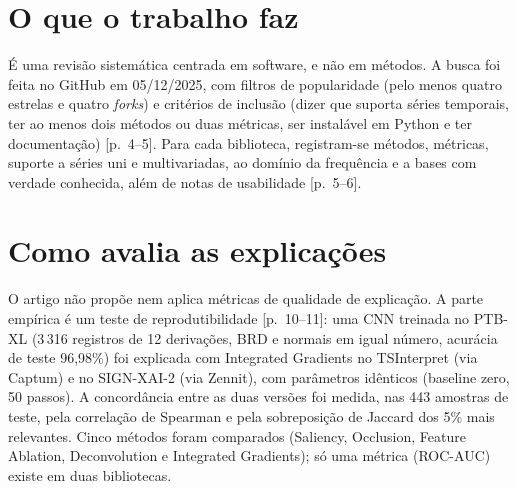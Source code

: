 \documentclass[11pt,a4paper]{article}
\begin{document}
\section{O que o trabalho faz}
É uma revisão sistemática centrada em software, e não em métodos. A busca foi feita no GitHub em 05/12/2025, com filtros de popularidade (pelo menos quatro estrelas e quatro \textit{forks}) e critérios de inclusão (dizer que suporta séries temporais, ter ao menos dois métodos ou duas métricas, ser instalável em Python e ter documentação) [p.~4--5]. Para cada biblioteca, registram-se métodos, métricas, suporte a séries uni e multivariadas, ao domínio da frequência e a bases com verdade conhecida, além de notas de usabilidade [p.~5--6].

\section{Como avalia as explicações}
O artigo não propõe nem aplica métricas de qualidade de explicação. A parte empírica é um teste de reprodutibilidade [p.~10--11]: uma CNN treinada no PTB-XL (3\,316 registros de 12 derivações, BRD e normais em igual número, acurácia de teste 96,98\%) foi explicada com Integrated Gradients no TSInterpret (via Captum) e no SIGN-XAI-2 (via Zennit), com parâmetros idênticos (baseline zero, 50 passos). A concordância entre as duas versões foi medida, nas 443 amostras de teste, pela correlação de Spearman e pela sobreposição de Jaccard dos 5\% mais relevantes. Cinco métodos foram comparados (Saliency, Occlusion, Feature Ablation, Deconvolution e Integrated Gradients); só uma métrica (ROC-AUC) existe em duas bibliotecas.
\end{document}
